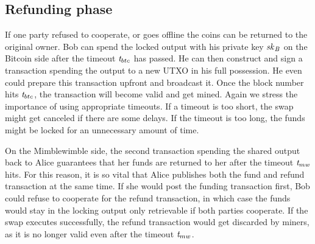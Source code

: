 \subsection{Refunding phase}\label{subsec:atom:refund}

If one party refused to cooperate, or goes offline the coins can be returned to the original owner.
Bob can spend the locked output with his private key $\mathit{sk}_{\mathit{B}}$ on the Bitcoin side after the timeout $\mathit{t}_{btc}$ has passed.
He can then construct and sign a transaction spending the output to a new UTXO in his full possession.
He even could prepare this transaction upfront and broadcast it.
Once the block number hits $\mathit{t}_{btc}$, the transaction will become valid and get mined.
Again we stress the importance of using appropriate timeouts.
If a timeout is too short, the swap might get canceled if there are some delays.
If the timeout is too long, the funds might be locked for an unnecessary amount of time.

On the Mimblewimble side, the second transaction spending the shared output back to Alice guarantees that her funds are returned to her after the timeout $\mathit{t}_{mw}$ hits.
For this reason, it is so vital that Alice publishes both the fund and refund transaction at the same time.
If she would post the funding transaction first, Bob could refuse to cooperate for the refund transaction, in which case the funds would stay in the locking output only retrievable if both parties cooperate.
If the swap executes successfully, the refund transaction would get discarded by miners, as it is no longer valid even after the timeout $\mathit{t}_{mw}$.